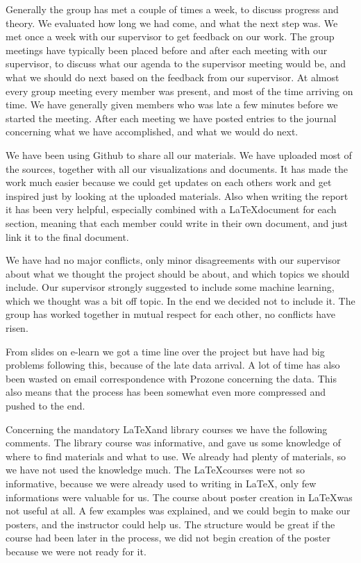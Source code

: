 \documentclass[Report.tex]{subfiles}
\begin{document}
Generally the group has met a couple of times a week, to discuss progress and theory. We evaluated how long we had come, and what the next step was. We met once a week with our supervisor to get feedback on our work. The group meetings have typically been placed before and after each meeting with our supervisor, to discuss what our agenda to the supervisor meeting would be, and what we should do next based on the feedback from our supervisor. At almost every group meeting every member was present, and most of the time arriving on time. We have generally given members who was late a few minutes before we started the meeting. After each meeting we have posted entries to the journal concerning what we have accomplished, and what we would do next.

We have been using Github to share all our materials. We have uploaded most of the sources, together with all our visualizations and documents. It has made the work much easier because we could get updates on each others work and get inspired just by looking at the uploaded materials. Also when writing the report it has been very helpful, especially combined with a \LaTeX \space document for each section, meaning that each member could write in their own document, and just link it to the final document.

We have had no major conflicts, only minor disagreements with our supervisor about what we thought the project should be about, and which topics we should include. Our supervisor strongly suggested to include some machine learning, which we thought was a bit off topic. In the end we decided not to include it. The group has worked together in mutual respect for each other, no conflicts have risen.

From slides on e-learn we got a time line over the project but have had big problems following this, because of the late data arrival. A lot of time has also been wasted on email correspondence with Prozone concerning the data. This also means that the process has been somewhat even more compressed and pushed to the end. 

Concerning the mandatory \LaTeX\space and library courses we have the following comments. The library course was informative, and gave us some knowledge of where to find materials and what to use. We already had plenty of materials, so we have not used the knowledge much. The \LaTeX \space courses were not so informative, because we were already used to writing in \LaTeX, only few informations were valuable for us. The course about poster creation in \LaTeX\space was not useful at all. A few examples was explained, and we could begin to make our posters, and the instructor could help us. The structure would be great if the course had been later in the process, we did not begin creation of the poster because we were not ready for it.
\end{document}
